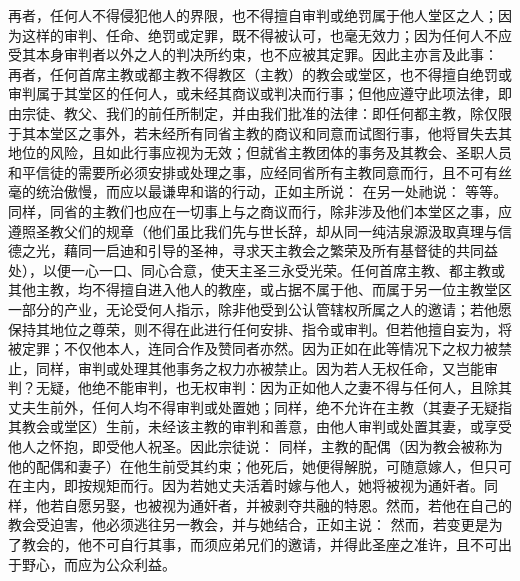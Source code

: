 再者，任何人不得侵犯他人的界限，也不得擅自审判或绝罚属于他人堂区之人；因为这样的审判、任命、绝罚或定罪，既不得被认可，也毫无效力；因为任何人不应受其本身审判者以外之人的判决所约束，也不应被其定罪。因此主亦言及此事： 再者，任何首席主教或都主教不得教区（主教）的教会或堂区，也不得擅自绝罚或审判属于其堂区的任何人，或未经其商议或判决而行事；但他应遵守此项法律，即由宗徒、教父、我们的前任所制定，并由我们批准的法律：即任何都主教，除仅限于其本堂区之事外，若未经所有同省主教的商议和同意而试图行事，他将冒失去其地位的风险，且如此行事应视为无效；但就省主教团体的事务及其教会、圣职人员和平信徒的需要所必须安排或处理之事，应经同省所有主教同意而行，且不可有丝毫的统治傲慢，而应以最谦卑和谐的行动，正如主所说： 在另一处祂说： 等等。同样，同省的主教们也应在一切事上与之商议而行，除非涉及他们本堂区之事，应遵照圣教父们的规章（他们虽比我们先与世长辞，却从同一纯洁泉源汲取真理与信德之光，藉同一启迪和引导的圣神，寻求天主教会之繁荣及所有基督徒的共同益处），以便一心一口、同心合意，使天主圣三永受光荣。任何首席主教、都主教或其他主教，均不得擅自进入他人的教座，或占据不属于他、而属于另一位主教堂区一部分的产业，无论受何人指示，除非他受到公认管辖权所属之人的邀请；若他愿保持其地位之尊荣，则不得在此进行任何安排、指令或审判。但若他擅自妄为，将被定罪；不仅他本人，连同合作及赞同者亦然。因为正如在此等情况下之权力被禁止，同样，审判或处理其他事务之权力亦被禁止。因为若人无权任命，又岂能审判？无疑，他绝不能审判，也无权审判：因为正如他人之妻不得与任何人，且除其丈夫生前外，任何人均不得审判或处置她；同样，绝不允许在主教（其妻子无疑指其教会或堂区）生前，未经该主教的审判和善意，由他人审判或处置其妻，或享受他人之怀抱，即受他人祝圣。因此宗徒说： 同样，主教的配偶（因为教会被称为他的配偶和妻子）在他生前受其约束；他死后，她便得解脱，可随意嫁人，但只可在主内，即按规矩而行。因为若她丈夫活着时嫁与他人，她将被视为通奸者。同样，他若自愿另娶，也被视为通奸者，并被剥夺共融的特恩。然而，若他在自己的教会受迫害，他必须逃往另一教会，并与她结合，正如主说： 然而，若变更是为了教会的，他不可自行其事，而须应弟兄们的邀请，并得此圣座之准许，且不可出于野心，而应为公众利益。\par

